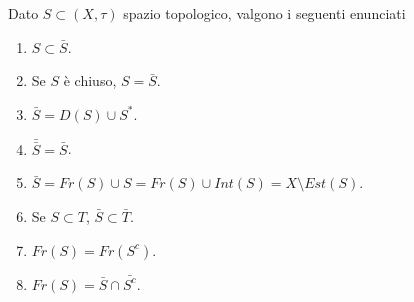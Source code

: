 \begin{proposition}
	Dato $S \subset (X,\tau)$ spazio topologico, valgono i seguenti enunciati
	\begin{enumerate}
		\item $S \subset \bar{S}$.
		\item Se $S$ è chiuso, $S = \bar{S}$.
		\item $\bar{S} = D(S) \cup S^*$.
		\item $\bar{\bar{S}} = \bar{S}$.
		\item $\bar{S} = Fr(S) \cup S = Fr(S) \cup Int(S) = X \setminus Est(S)$.
		\item Se $S \subset  T$, $\bar{S} \subset \bar{T}$.
		\item $Fr(S) = Fr(S^c)$.
		\item $Fr(S) = \bar{S} \cap \bar{S^c}$.
	\end{enumerate}
\end{proposition}
